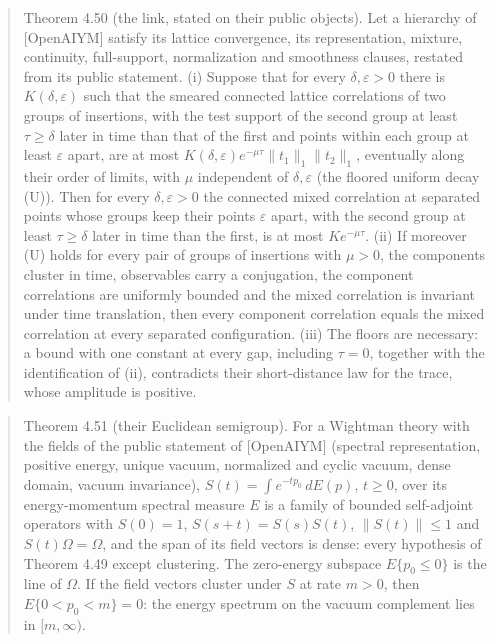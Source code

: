 \documentclass[10pt,letterpaper,twocolumn]{article}
\begin{document}
\begin{quote}
Theorem 4.50 (the link, stated on their public objects). Let a hierarchy of {[}OpenAIYM{]} satisfy its lattice convergence, its representation, mixture, continuity, full-support, normalization and smoothness clauses, restated from its public statement. (i) Suppose that for every \(\delta,\varepsilon>0\) there is \(K(\delta,\varepsilon)\) such that the smeared connected lattice correlations of two groups of insertions, with the test support of the second group at least \(\tau\ge\delta\) later in time than that of the first and points within each group at least \(\varepsilon\) apart, are at most \(K(\delta,\varepsilon)e^{-\mu\tau}\lVert t_1\rVert_1\lVert t_2\rVert_1\), eventually along their order of limits, with \(\mu\) independent of \(\delta,\varepsilon\) (the floored uniform decay (U)). Then for every \(\delta,\varepsilon>0\) the connected mixed correlation at separated points whose groups keep their points \(\varepsilon\) apart, with the second group at least \(\tau\ge\delta\) later in time than the first, is at most \(K e^{-\mu\tau}\). (ii) If moreover (U) holds for every pair of groups of insertions with \(\mu>0\), the components cluster in time, observables carry a conjugation, the component correlations are uniformly bounded and the mixed correlation is invariant under time translation, then every component correlation equals the mixed correlation at every separated configuration. (iii) The floors are necessary: a bound with one constant at every gap, including \(\tau=0\), together with the identification of (ii), contradicts their short-distance law for the trace, whose amplitude is positive.
\end{quote}

\begin{quote}
Theorem 4.51 (their Euclidean semigroup). For a Wightman theory with the fields of the public statement of {[}OpenAIYM{]} (spectral representation, positive energy, unique vacuum, normalized and cyclic vacuum, dense domain, vacuum invariance), \(S(t)=\int e^{-tp_0}\,dE(p)\), \(t\ge0\), over its energy-momentum spectral measure \(E\) is a family of bounded self-adjoint operators with \(S(0)=1\), \(S(s+t)=S(s)S(t)\), \(\lVert S(t)\rVert\le1\) and \(S(t)\Omega=\Omega\), and the span of its field vectors is dense: every hypothesis of Theorem 4.49 except clustering. The zero-energy subspace \(E\{p_0\le0\}\) is the line of \(\Omega\). If the field vectors cluster under \(S\) at rate \(m>0\), then \(E\{0<p_0<m\}=0\): the energy spectrum on the vacuum complement lies in \([m,\infty)\).
\end{quote}
\end{document}
